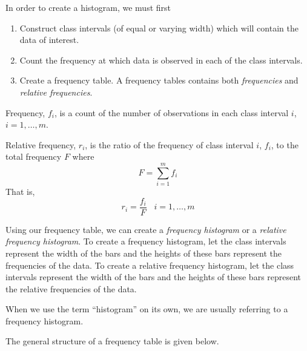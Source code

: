 \noindent
In order to create a histogram, we must first
\begin{enumerate}
\item Construct class intervals (of equal or varying width) which will contain the data of interest.
\item Count the frequency at which data is observed in each of 
the class intervals.
\item Create a frequency table. A frequency tables contains both \textit{frequencies} and \textit{relative frequencies}. 
\end{enumerate}

\begin{definition}[Frequency]	
Frequency, $f_i$, is a count of the number of observations in each class interval $i$, $i=1,\hdots, m$.
\end{definition}

\begin{definition}	
Relative frequency, $r_i$, is the ratio of the frequency of class interval $i$, $f_i$, to the total frequency $F$ where
\[ F = \sum_{i=1}^{m} f_i \]
That is,
\[ r_i = \frac{f_i}{F} \; \; \; i= 1, \hdots, m \]
\end{definition}

Using our frequency table, we can create a \textit{frequency histogram} or a \textit{relative frequency histogram}. To create a frequency histogram, let the class intervals represent the width of the bars and the heights of these bars represent the frequencies of the data. To create a relative frequency histogram, let the class intervals represent the width of the bars and the heights of these bars represent the relative frequencies of the data.


\begin{nt}
When we use the term ``histogram'' on its own, we are usually referring to a frequency histogram.
\end{nt}


The general structure of a frequency table is given below.

